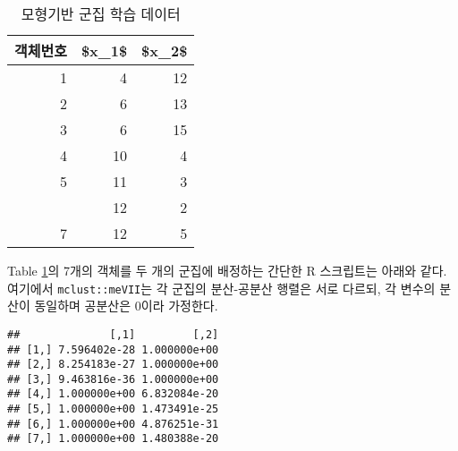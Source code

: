 \documentclass[]{book}
\newenvironment{Shaded}{\begin{snugshade}}{\end{snugshade}}
\newcommand{\CommentTok}[1]{\textcolor[rgb]{0.56,0.35,0.01}{\textit{#1}}}
\newcommand{\DataTypeTok}[1]{\textcolor[rgb]{0.13,0.29,0.53}{#1}}
\newcommand{\DecValTok}[1]{\textcolor[rgb]{0.00,0.00,0.81}{#1}}
\newcommand{\KeywordTok}[1]{\textcolor[rgb]{0.13,0.29,0.53}{\textbf{#1}}}
\newcommand{\NormalTok}[1]{#1}
\newcommand{\OperatorTok}[1]{\textcolor[rgb]{0.81,0.36,0.00}{\textbf{#1}}}
\newcommand{\StringTok}[1]{\textcolor[rgb]{0.31,0.60,0.02}{#1}}
\begin{document}
\begin{table}[t]

\caption{\label{tab:model-based-clustering-data}모형기반 군집 학습 데이터}
\centering
\begin{tabular}{rrr}
\toprule
객체번호 & \$x\_1\$ & \$x\_2\$\\
\midrule
1 & 4 & 12\\
2 & 6 & 13\\
3 & 6 & 15\\
4 & 10 & 4\\
5 & 11 & 3\\
\addlinespace
6 & 12 & 2\\
7 & 12 & 5\\
\bottomrule
\end{tabular}
\end{table}

Table \ref{tab:model-based-clustering-data}의 7개의 객체를 두 개의 군집에 배정하는 간단한 R 스크립트는 아래와 같다. 여기에서 \texttt{mclust::meVII}는 각 군집의 분산-공분산 행렬은 서로 다르되, 각 변수의 분산이 동일하며 공분산은 0이라 가정한다.

\begin{Shaded}
\end{Shaded}

\begin{verbatim}
##              [,1]         [,2]
## [1,] 7.596402e-28 1.000000e+00
## [2,] 8.254183e-27 1.000000e+00
## [3,] 9.463816e-36 1.000000e+00
## [4,] 1.000000e+00 6.832084e-20
## [5,] 1.000000e+00 1.473491e-25
## [6,] 1.000000e+00 4.876251e-31
## [7,] 1.000000e+00 1.480388e-20
\end{verbatim}
\end{document}

